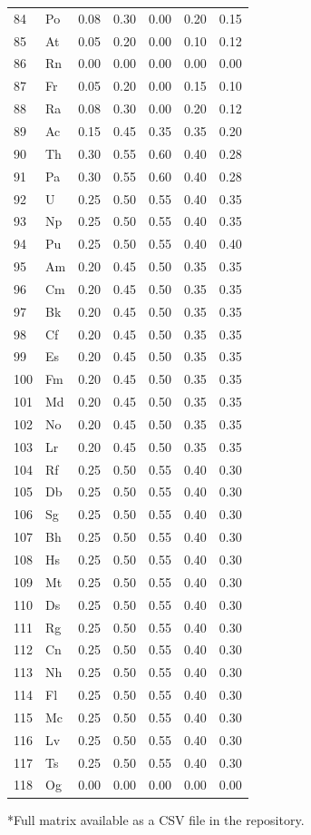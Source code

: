 \documentclass[12pt,a4paper]{article}
\begin{document}
\begin{longtable}{p{2.2cm}p{1.2cm}p{2.2cm}p{2.2cm}p{2.2cm}p{2.2cm}p{2.2cm}}
		84 & Po  & 0.08 & 0.30 & 0.00 & 0.20 & 0.15 \\
		85 & At  & 0.05 & 0.20 & 0.00 & 0.10 & 0.12 \\
		86 & Rn  & 0.00 & 0.00 & 0.00 & 0.00 & 0.00 \\
		87 & Fr  & 0.05 & 0.20 & 0.00 & 0.15 & 0.10 \\
		88 & Ra  & 0.08 & 0.30 & 0.00 & 0.20 & 0.12 \\
		89 & Ac  & 0.15 & 0.45 & 0.35 & 0.35 & 0.20 \\
		90 & Th  & 0.30 & 0.55 & 0.60 & 0.40 & 0.28 \\
		91 & Pa  & 0.30 & 0.55 & 0.60 & 0.40 & 0.28 \\
		92 & U   & 0.25 & 0.50 & 0.55 & 0.40 & 0.35 \\
		93 & Np  & 0.25 & 0.50 & 0.55 & 0.40 & 0.35 \\
		94 & Pu  & 0.25 & 0.50 & 0.55 & 0.40 & 0.40 \\
		95 & Am  & 0.20 & 0.45 & 0.50 & 0.35 & 0.35 \\
		96 & Cm  & 0.20 & 0.45 & 0.50 & 0.35 & 0.35 \\
		97 & Bk  & 0.20 & 0.45 & 0.50 & 0.35 & 0.35 \\
		98 & Cf  & 0.20 & 0.45 & 0.50 & 0.35 & 0.35 \\
		99 & Es  & 0.20 & 0.45 & 0.50 & 0.35 & 0.35 \\
		100& Fm  & 0.20 & 0.45 & 0.50 & 0.35 & 0.35 \\
		101& Md  & 0.20 & 0.45 & 0.50 & 0.35 & 0.35 \\
		102& No  & 0.20 & 0.45 & 0.50 & 0.35 & 0.35 \\
		103& Lr  & 0.20 & 0.45 & 0.50 & 0.35 & 0.35 \\
		104& Rf  & 0.25 & 0.50 & 0.55 & 0.40 & 0.30 \\
		105& Db  & 0.25 & 0.50 & 0.55 & 0.40 & 0.30 \\
		106& Sg  & 0.25 & 0.50 & 0.55 & 0.40 & 0.30 \\
		107& Bh  & 0.25 & 0.50 & 0.55 & 0.40 & 0.30 \\
		108& Hs  & 0.25 & 0.50 & 0.55 & 0.40 & 0.30 \\
		109& Mt  & 0.25 & 0.50 & 0.55 & 0.40 & 0.30 \\
		110& Ds  & 0.25 & 0.50 & 0.55 & 0.40 & 0.30 \\
		111& Rg  & 0.25 & 0.50 & 0.55 & 0.40 & 0.30 \\
		112& Cn  & 0.25 & 0.50 & 0.55 & 0.40 & 0.30 \\
		113& Nh  & 0.25 & 0.50 & 0.55 & 0.40 & 0.30 \\
		114& Fl  & 0.25 & 0.50 & 0.55 & 0.40 & 0.30 \\
		115& Mc  & 0.25 & 0.50 & 0.55 & 0.40 & 0.30 \\
		116& Lv  & 0.25 & 0.50 & 0.55 & 0.40 & 0.30 \\
		117& Ts  & 0.25 & 0.50 & 0.55 & 0.40 & 0.30 \\
		118& Og  & 0.00 & 0.00 & 0.00 & 0.00 & 0.00 \\
		\bottomrule
	\end{longtable}
	*Full matrix available as a CSV file in the repository.
	
\end{document}
